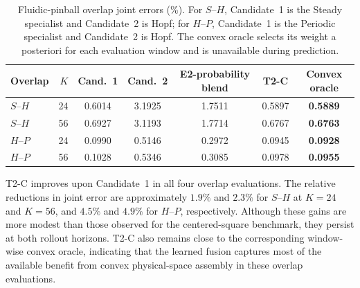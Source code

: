 \par
\begin{table}[H]
\centering
\caption{
Fluidic-pinball overlap joint errors (\%). For $S$--$H$, Candidate~1 is the Steady specialist and Candidate~2 is Hopf; for $H$--$P$, Candidate~1 is the Periodic specialist and Candidate~2 is Hopf.
The convex oracle selects its weight a posteriori for each evaluation window and is unavailable during prediction.
}
\label{tab:pinball_overlap}
\small
\setlength{\tabcolsep}{3.5pt}
\begin{tabular}{lrccccc}
\toprule
Overlap & $K$ & Cand.~1 & Cand.~2 & E2-probability blend & T2-C & Convex oracle \\
\midrule
$S$--$H$ & 24 & 0.6014 & 3.1925 & 1.7511 & 0.5897 & \textbf{0.5889} \\
$S$--$H$ & 56 & 0.6927 & 3.1193 & 1.7714 & 0.6767 & \textbf{0.6763} \\
$H$--$P$ & 24 & 0.0990 & 0.5146 & 0.2972 & 0.0945 & \textbf{0.0928} \\
$H$--$P$ & 56 & 0.1028 & 0.5346 & 0.3085 & 0.0978 & \textbf{0.0955} \\
\bottomrule
\end{tabular}
\end{table}
\par

T2-C improves upon Candidate~1 in all four overlap evaluations.
The relative reductions in joint error are approximately $1.9\%$ and
$2.3\%$ for $S$--$H$ at $K=24$ and $K=56$, and $4.5\%$ and $4.9\%$
for $H$--$P$, respectively. Although these gains are more modest than those observed for the centered-square benchmark, they persist at both rollout horizons. T2-C also remains close to the corresponding window-wise convex oracle, indicating that the learned fusion captures most of the available benefit from convex physical-space assembly in these overlap evaluations.
